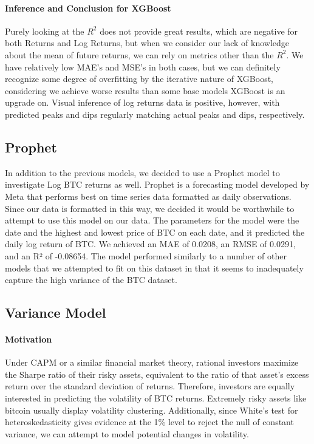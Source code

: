 \documentclass{article}
\begin{document}
\paragraph{Inference and Conclusion for XGBoost}
Purely looking at the $R^2$ does not provide great results, which are negative for both Returns and Log Returns, but when we consider our lack of knowledge about the mean of future returns, we can rely on metrics other than the $R^2$. We have relatively low MAE’s and MSE’s in both cases, but we can definitely recognize some degree of overfitting by the iterative nature of XGBoost, considering we achieve worse results than some base models XGBoost is an upgrade on. Visual inference of log returns data is positive, however, with predicted peaks and dips regularly matching actual peaks and dips, respectively.

\subsection{Prophet}
In addition to the previous models, we decided to use a Prophet model to investigate Log BTC returns as well. Prophet is a forecasting model developed by Meta that performs best on time series data formatted as daily observations. Since our data is formatted in this way, we decided it would be worthwhile to attempt to use this model on our data. The parameters for the model were the date and the highest and lowest price of BTC on each date, and it predicted the daily log return of BTC. We achieved an MAE of 0.0208, an RMSE  of 0.0291, and an R² of -0.08654. The model performed similarly to a number of other models that we attempted to fit on this dataset in that it seems to inadequately capture the high variance of the BTC dataset. 


\subsection{Variance Model}
\paragraph{Motivation}
Under CAPM or a similar financial market theory, rational investors maximize the Sharpe ratio of their risky assets, equivalent to the ratio of that asset’s excess return over the standard deviation of returns. Therefore, investors are equally interested in predicting the volatility of BTC returns. Extremely risky assets like bitcoin usually display volatility clustering. Additionally, since White’s test for heteroskedasticity gives evidence at the 1\% level to reject the null of constant variance, we can attempt to model potential changes in volatility.
\end{document}
